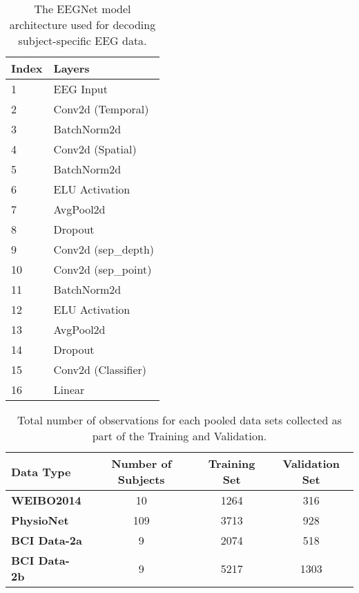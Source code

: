 \documentclass{ieeeaccess}
\begin{document}
    \begin{table}
        \centering 
        \caption{The EEGNet model architecture used for decoding subject-specific EEG data.}
        \label{tab:EEGNet}
        \begin{tabular}{ll}
            \toprule
            \textbf{Index} &       \textbf{Layers} \\
            \midrule
            1  &           EEG Input \\
            2  &           Conv2d (Temporal) \\
            3  &           BatchNorm2d \\
            \midrule 
            4  &           Conv2d (Spatial) \\
            5  &           BatchNorm2d \\
            6  &           ELU Activation \\
            \midrule
            7  &             AvgPool2d \\
            8  &               Dropout \\
            \midrule
            9  &                Conv2d (sep\_depth) \\
            10 &                Conv2d (sep\_point)\\
            11 &           BatchNorm2d \\
            12 &        ELU Activation \\
            \midrule
            13 &             AvgPool2d \\
            14 &               Dropout \\
            \midrule
            15 &             Conv2d (Classifier) \\
            16 &            Linear   \\
            \bottomrule
        \end{tabular}
    \end{table}
    
    
    \begin{table}[H] 
        \centering    
        \caption{Total number of observations for each pooled data sets collected as part of the Training and Validation.} 
        \begin{tabular}{l|c|cc}
            \toprule
            \textbf{\textbf{Data Type}} & \textbf{Number of Subjects} & \textbf{Training Set} &  \textbf{Validation Set} \\
            \midrule
            \textbf{WEIBO2014} &  10 & 1264 &  316  \\
            \midrule
            \textbf{PhysioNet}  & 109 & 3713 &  928 \\
            \midrule
            \textbf{BCI Data-2a} & 9 & 2074 &  518  \\
            \midrule        
            \textbf{BCI Data-2b} & 9 & 5217 &  1303 \\
            \bottomrule                  
        \end{tabular}
        \label{tab:dataset}    
    \end{table}
    
\end{document}
